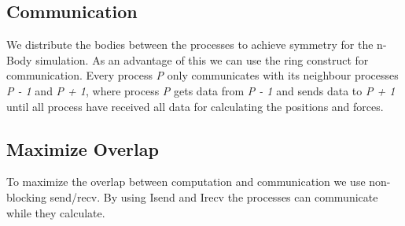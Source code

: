 \documentclass[oneside, a4paper, DIV=10]{scrartcl}
\begin{document}
    \subsection*{Communication}
    We distribute the bodies between the processes to achieve symmetry for the
    n-Body simulation. As an advantage of this we can use the ring construct for
    communication. Every process \textit{P} only communicates with its neighbour
    processes \textit{P - 1} and \textit{P + 1}, where process \textit{P} gets
    data from \textit{P - 1} and sends data to \textit{P + 1} until all process
    have received all data for calculating the positions and forces.
    
    \subsection*{Maximize Overlap}
    To maximize the overlap between computation and communication we use 
    non-blocking send/recv. By using Isend and Irecv the processes can communicate
    while they calculate. 
    
\end{document}
